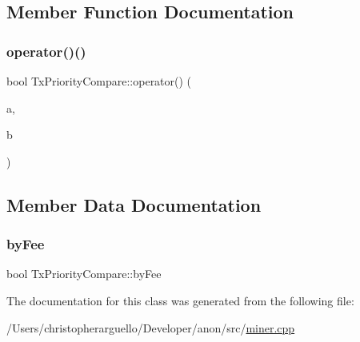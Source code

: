\subsection{Member Function Documentation}
\mbox{\label{class_tx_priority_compare_ab50fdbeb5862709d13a271c11ade1775}} 
\subsubsection{\texorpdfstring{operator()()}{operator()()}}
{\footnotesize\ttfamily bool Tx\+Priority\+Compare\+::operator() (\begin{DoxyParamCaption}\item[{const \mbox{\hyperlink{miner_8cpp_a978fa41d50b6f9b1ee69c34d243ea1c7}{Tx\+Priority}} \&}]{a,  }\item[{const \mbox{\hyperlink{miner_8cpp_a978fa41d50b6f9b1ee69c34d243ea1c7}{Tx\+Priority}} \&}]{b }\end{DoxyParamCaption})\hspace{0.3cm}{\ttfamily [inline]}}



\subsection{Member Data Documentation}
\mbox{\label{class_tx_priority_compare_af1131beb8df18cfff0376939902cc6de}} 
\subsubsection{\texorpdfstring{by\+Fee}{byFee}}
{\footnotesize\ttfamily bool Tx\+Priority\+Compare\+::by\+Fee\hspace{0.3cm}{\ttfamily [private]}}



The documentation for this class was generated from the following file\+:\begin{DoxyCompactItemize}
\item 
/\+Users/christopherarguello/\+Developer/anon/src/\mbox{\hyperlink{miner_8cpp}{miner.\+cpp}}\end{DoxyCompactItemize}

